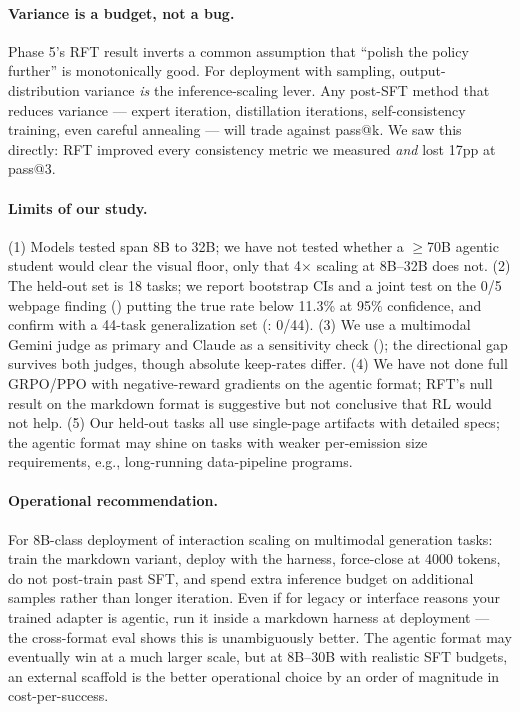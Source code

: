 \documentclass[11pt]{article}
\begin{document}
\paragraph{Variance is a budget, not a bug.} Phase 5's RFT result inverts a common assumption that ``polish the policy further'' is monotonically good. For deployment with sampling, output-distribution variance \emph{is} the inference-scaling lever. Any post-SFT method that reduces variance --- expert iteration, distillation iterations, self-consistency training, even careful annealing --- will trade against pass@k. We saw this directly: RFT improved every consistency metric we measured \emph{and} lost 17pp at pass@3.

\paragraph{Limits of our study.} (1) Models tested span 8B to 32B; we have not tested whether a $\ge$70B agentic student would clear the visual floor, only that 4$\times$ scaling at 8B--32B does not. (2) The held-out set is 18 tasks; we report bootstrap CIs and a joint test on the 0/5 webpage finding () putting the true rate below 11.3\% at 95\% confidence, and confirm with a 44-task generalization set (: 0/44). (3) We use a multimodal Gemini judge as primary and Claude as a sensitivity check (); the directional gap survives both judges, though absolute keep-rates differ. (4) We have not done full GRPO/PPO with negative-reward gradients on the agentic format; RFT's null result on the markdown format is suggestive but not conclusive that RL would not help. (5) Our held-out tasks all use single-page artifacts with detailed specs; the agentic format may shine on tasks with weaker per-emission size requirements, e.g., long-running data-pipeline programs.

\paragraph{Operational recommendation.} For 8B-class deployment of interaction scaling on multimodal generation tasks: train the markdown variant, deploy with the harness, force-close at 4000 tokens, do not post-train past SFT, and spend extra inference budget on additional samples rather than longer iteration. Even if for legacy or interface reasons your trained adapter is agentic, run it inside a markdown harness at deployment --- the cross-format eval shows this is unambiguously better. The agentic format may eventually win at a much larger scale, but at 8B--30B with realistic SFT budgets, an external scaffold is the better operational choice by an order of magnitude in cost-per-success.
\end{document}
